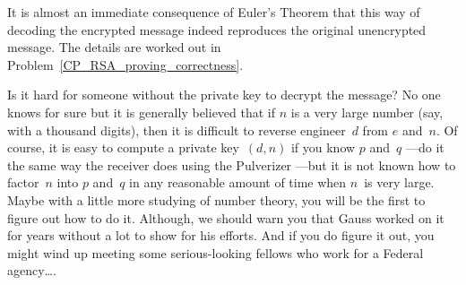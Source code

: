 It is almost an immediate consequence of Euler's Theorem that this way
of decoding the encrypted message indeed reproduces the original
unencrypted message.  The details are worked out in
Problem~\ref{CP_RSA_proving_correctness}.





\iffalse
In order to check that this is the
case, we need to show that the decryption
$\rem{(m^*)^d}{n}$ is indeed equal to the sender's message~$m$.  Since
$m^* = \rem{m^e}{n}$, \ $m^*$ is congruent to~$m^e$ modulo~$n$ by
Corollary~\ref{aran}.  That is,
\begin{equation*}
    m^* \equiv m^e \pmod n.
\end{equation*}
By raising both sides to the power~$d$, we obtain the congruence
\begin{equation}\label{eq:RSAx1}
    (m^*)^d \equiv m^{ed} \pmod n.
\end{equation}
The encryption exponent~$e$ and the decryption exponent~$d$ are chosen
such that $de \equiv 1 \pmod{(p - 1)(q - 1)}$.  So, there exists an
integer~$r$ such that $ed = 1 + r(p - 1)(q - 1)$.  By substituting $1
+ r(p - 1)(q - 1)$ for~$ed$ in Equation~\ref{eq:RSAx1}, we obtain
\begin{equation}\label{eq:RSAx2}
    (m^*)^d \equiv m \cdot m^{r(p - 1)(q - 1)} \pmod n.
\end{equation}

By Euler's Theorem and the assumption that $\gcd(m, n) = 1$, we know
that
\begin{equation*}
    m^{\phi(n)} \equiv 1 \pmod n.
\end{equation*}
From Corollary~\ref{cor:H7}, we know that $\phi(n) = (p - 1)(q - 1)$.
Hence,
\begin{align*}
(m^*)^d  &= m \cdot m^{r(p-1)(q-1)} \pmod{n} \\
        &= m \cdot 1^{r} \pmod{n} \\
        &= m \pmod{n}.
\end{align*}
Hence, the decryption process indeed reproduces the original
message~$m$.
\fi


Is it hard for someone without the private key to decrypt the message?
No one knows for sure but it is generally believed that if $n$ is a
very large number (say, with a thousand digits), then it is difficult
to reverse engineer~$d$ from $e$ and~$n$.  Of course, it is easy to
compute a private key~$(d, n)$ if you know $p$ and~$q$ ---do it the
same way the receiver does using the Pulverizer ---but it is not known
how to factor~$n$ into $p$ and~$q$ in any reasonable amount of time
when $n$~is very large.  Maybe with a little more studying of number
theory, you will be the first to figure out how to do it.  Although,
we should warn you that Gauss worked on it for years without a lot to
show for his efforts.  And if you do figure it out, you might wind up
meeting some serious-looking fellows who work for a Federal
agency\dots.

